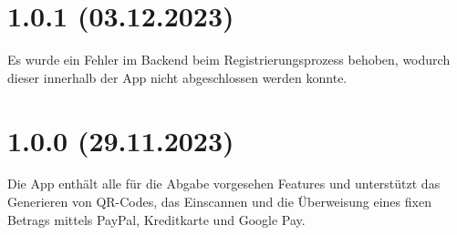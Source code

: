 
\section*{1.0.1 (03.12.2023)}
Es wurde ein Fehler im Backend beim Registrierungsprozess behoben, wodurch dieser innerhalb der App nicht abgeschlossen werden konnte.
\section*{1.0.0 (29.11.2023)}
Die App enthält alle für die Abgabe vorgesehen Features und unterstützt das Generieren von QR-Codes, das Einscannen und die Überweisung eines fixen Betrags mittels PayPal, Kreditkarte und Google Pay.
